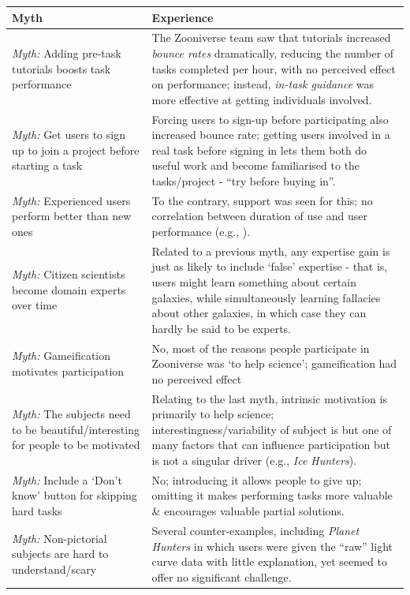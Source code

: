 \documentclass{sigchi}
\begin{document}
\begin{table}
\begin{center}
\begin{tabular}{p{4.5cm}p{13cm}}
Myth & Experience \\
\hline
\emph{Myth:} Adding pre-task tutorials boosts task performance & The Zooniverse team saw that tutorials increased \emph{bounce rates} dramatically, reducing the number of tasks completed per hour, with no perceived effect on performance; instead, \emph{in-task guidance} was more effective at getting individuals involved. \\
\hline
\emph{Myth:} Get users to sign up to join a project before starting a task & Forcing users to sign-up before participating also increased bounce rate; getting users involved in a real task before signing in lets them both do useful work and become familiarised to the tasks/project - ``try before buying in''. \\
\hline
\emph{Myth:} Experienced users perform better than new ones &  To the contrary, support was seen for this; no correlation between duration of use and user performance (e.g., \cite{simpson2013dynamic}). \\
\hline
\emph{Myth:} Citizen scientists become domain experts over time &  Related to a previous myth, any expertise gain is just as likely to include `false' expertise - that is, users might learn something about certain galaxies, while simultaneously learning fallacies about other galaxies, in which case they can hardly be said to be experts. \\
\hline
\emph{Myth:} Gameification motivates participation &  No, most of the reasons people participate in Zooniverse was `to help science'; gameification had no perceived effect \\
\hline
\emph{Myth:} The subjects need to be beautiful/interesting for people to be motivated & Relating to the last myth, intrinsic motivation is primarily to help science; interestingness/variability of subject is but one of many factors that can influence participation but is not a singular driver (e.g., \emph{Ice Hunters}). \\
\hline
\emph{Myth:} Include a `Don't know' button for skipping hard tasks &  No; introducing it allows people to give up; omitting it makes performing tasks more valuable \& encourages valuable partial solutions. \\
\hline
\emph{Myth:} Non-pictorial subjects are hard to understand/scary &  Several counter-examples, including \emph{Planet Hunters} in which users were given the ``raw'' light curve data with little explanation, yet seemed to offer no significant challenge. \\

\end{tabular}
\end{center}
\end{table}
\end{document}

